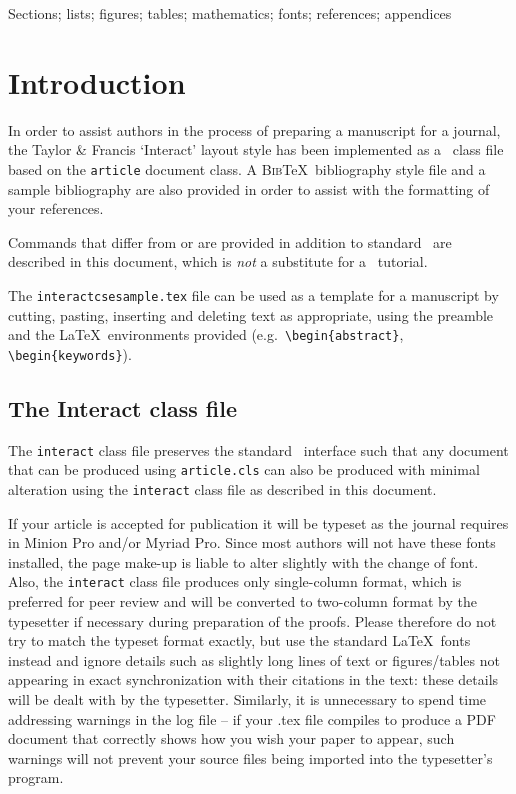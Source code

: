 \documentclass[]{interact}
\theoremstyle{plain}%
\theoremstyle{definition}
\theoremstyle{remark}
\begin{document}
\begin{keywords}
Sections; lists; figures; tables; mathematics; fonts; references; appendices
\end{keywords}


\section{Introduction}

In order to assist authors in the process of preparing a manuscript for a journal, the Taylor \& Francis `\textsf{Interact}' layout style has been implemented as a \LaTeXe\ class file based on the \texttt{article} document class. A \textsc{Bib}\TeX\ bibliography style file and a sample bibliography are also provided in order to assist with the formatting of your references.

Commands that differ from or are provided in addition to standard \LaTeXe\ are described in this document, which is \emph{not} a substitute for a \LaTeXe\ tutorial.

The \texttt{interactcsesample.tex} file can be used as a template for a manuscript by cutting, pasting, inserting and deleting text as appropriate, using the preamble and the \LaTeX\ environments provided (e.g.\ \verb"\begin{abstract}", \verb"\begin{keywords}").


\subsection{The \textsf{Interact} class file}\label{class}

The \texttt{interact} class file preserves the standard \LaTeXe\ interface such that any document that can be produced using \texttt{article.cls} can also be produced with minimal alteration using the \texttt{interact} class file as described in this document.

If your article is accepted for publication it will be typeset as the journal requires in Minion Pro and/or Myriad Pro. Since most authors will not have these fonts installed, the page make-up is liable to alter slightly with the change of font. Also, the \texttt{interact} class file produces only single-column format, which is preferred for peer review and will be converted to two-column format by the typesetter if necessary during preparation of the proofs. Please therefore do not try to match the typeset format exactly, but use the standard \LaTeX\ fonts instead and ignore details such as slightly long lines of text or figures/tables not appearing in exact synchronization with their citations in the text: these details will be dealt with by the typesetter. Similarly, it is unnecessary to spend time addressing warnings in the log file -- if your .tex file compiles to produce a PDF document that correctly shows how you wish your paper to appear, such warnings will not prevent your source files being imported into the typesetter's program.
\end{document}
